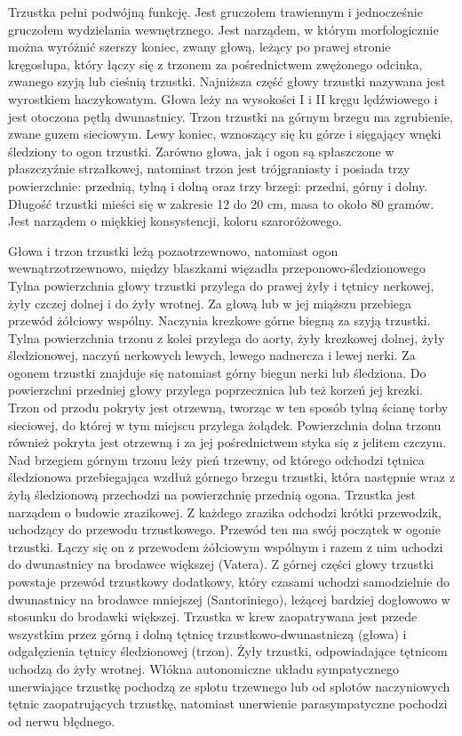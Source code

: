 \documentclass[a4paper, 12pt]{report}
\begin{document}
Trzustka pełni podwójną funkcję. Jest gruczołem trawiennym i
jednocześnie gruczołem wydzielania wewnętrznego. Jest narządem, w którym
morfologicznie można wyróżnić szerszy koniec, zwany głową, leżący po
prawej stronie kręgosłupa, który łączy się z trzonem za pośrednictwem
zwężonego odcinka, zwanego szyją lub cieśnią trzustki. Najniższa część
głowy trzustki nazywana jest wyrostkiem haczykowatym. Głowa leży na
wysokości I i II kręgu lędźwiowego i jest otoczona pętlą dwunastnicy. 
Trzon trzustki na górnym brzegu ma zgrubienie, zwane guzem sieciowym. Lewy koniec,
wznoszący się ku górze i sięgający wnęki śledziony to ogon trzustki.
Zarówno głowa, jak i ogon są spłaszczone w płaszczyźnie strzałkowej,
natomiast trzon jest trójgraniasty i posiada trzy powierzchnie:
przednią, tylną i dolną oraz trzy brzegi: przedni, górny i dolny.
Długość trzustki mieści się w zakresie 12 do 20 cm, masa to około 80
gramów. Jest narządem o miękkiej konsystencji, koloru szaroróżowego.

Głowa i trzon trzustki leżą pozaotrzewnowo, natomiast ogon
wewnątrzotrzewnowo, między blaszkami więzadła
przeponowo-śledzionowego
Tylna powierzchnia głowy trzustki przylega do prawej żyły i tętnicy
nerkowej, żyły czczej dolnej i do żyły wrotnej. Za głową lub w jej
miąższu przebiega przewód żółciowy wspólny. Naczynia krezkowe górne
biegną za szyją trzustki. Tylna powierzchnia trzonu z kolei przylega
do aorty, żyły krezkowej dolnej, żyły śledzionowej, naczyń nerkowych
lewych, lewego nadnercza i lewej nerki. Za ogonem trzustki znajduje
się natomiast górny biegun nerki lub śledziona. Do powierzchni
przedniej głowy przylega poprzecznica lub też korzeń jej krezki. Trzon
od przodu pokryty jest otrzewną, tworząc w ten sposób tylną ścianę
torby sieciowej, do której w tym miejscu przylega
żołądek. Powierzchnia dolna trzonu również pokryta jest otrzewną i za
jej pośrednictwem styka się z jelitem czczym. Nad brzegiem górnym
trzonu leży pień trzewny, od którego odchodzi tętnica śledzionowa
przebiegająca wzdłuż górnego brzegu trzustki, która następnie
wraz z żyłą śledzionową przechodzi na powierzchnię przednią ogona.
Trzustka jest narządem o budowie zrazikowej. Z każdego zrazika
odchodzi krótki przewodzik, uchodzący do przewodu
trzustkowego. Przewód ten ma swój początek w ogonie trzustki. Łączy
się on z przewodem żółciowym wspólnym i razem z nim uchodzi do
dwunastnicy na brodawce większej (Vatera). Z górnej części głowy trzustki
powstaje przewód trzustkowy dodatkowy, który czasami uchodzi
samodzielnie do dwunastnicy na brodawce mniejszej (Santoriniego), leżącej bardziej
dogłowowo w stosunku do brodawki większej.  Trzustka w krew
zaopatrywana jest przede wszystkim przez górną i dolną tętnicę trzustkowo-dwunastniczą
(głowa) i odgałęzienia tętnicy śledzionowej (trzon). Żyły trzustki,
odpowiadające tętnicom uchodzą do żyły wrotnej. Włókna autonomiczne
układu sympatycznego unerwiające trzustkę pochodzą ze splotu trzewnego lub od splotów
naczyniowych tętnic zaopatrujących trzustkę, natomiast unerwienie
parasympatyczne pochodzi od nerwu błędnego.
\end{document}
